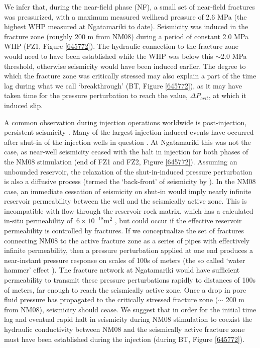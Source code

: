 We infer that, during the near-field phase (NF), a small set of near-field fractures was pressurized, with a maximum measured wellhead pressure of 2.6 MPa (the highest WHP measured at Ngatamariki to date). Seismicity was induced in the fracture zone (roughly 200 m from NM08) during a period of constant 2.0 MPa WHP (FZ1, Figure \ref{645772}). The hydraulic connection to the fracture zone would need to have been established while the WHP was below this $\sim$2.0 MPa threshold, otherwise seismicity would have been induced earlier. The degree to which the fracture zone was critically stressed may also explain a part of the time lag during what we call `breakthrough' (BT, Figure \ref{645772}), as it may have taken time for the pressure perturbation to reach the value, $\Delta{P_{crit}}$, at which it induced slip.

A common observation during injection operations worldwide is post-injection, persistent seismicity \citep[e.g.][]{Fehler_1998,Rutledge_2003,Shapiro_2002}. Many of the largest injection-induced events have occurred after shut-in of the injection wells in question \citep[e.g.][at Basel]{Mukuhira_2017}. At Ngatamariki this was not the case, as near-well seismicity ceased with the halt in injection for both phases of the NM08 stimulation (end of FZ1 and FZ2, Figure \ref{645772}). Assuming an unbounded reservoir, the relaxation of the shut-in-induced pressure perturbation is also a diffusive process (termed the `back-front' of seismicity by \citet{Parotidis_2004}). In the NM08 case, an immediate cessation of seismicity on shut-in would imply nearly infinite reservoir permeability between the well and the seismically active zone. This is incompatible with flow through the reservoir rock matrix, which has a calculated in-situ permeability of $~6\times10^{-18}$m$^2$ \citep{Cant_2018}, but could occur if the effective reservoir permeability is controlled by fractures. If we conceptualize the set of fractures connecting NM08 to the active fracture zone as a series of pipes with effectively infinite permeability, then a pressure perturbation applied at one end produces a near-instant pressure response on scales of 100s of meters (the so called `water hammer' effect \citep{Ghidaoui_2005}). The fracture network at Ngatamariki would have sufficient permeability to transmit these pressure perturbations rapidly to distances of 100s of meters, far enough to reach the seismically active zone. Once a drop in pore fluid pressure has propagated to the critically stressed fracture zone ($\sim$ 200 m from NM08), seismicity should cease. We suggest that in order for the initial time lag and eventual rapid halt in seismicity during NM08 stimulation to coexist the hydraulic conductivity between NM08 and the seismically active fracture zone must have been established during the injection (during BT, Figure \ref{645772}).

